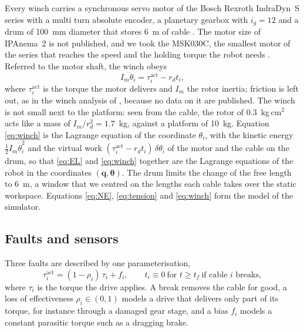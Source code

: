 \documentclass{interact}
\newcommand{\vc}[1]{\bm{#1}}
\begin{document}
Every winch carries a synchronous servo motor of the Bosch Rexroth IndraDyn~S series with a multi turn absolute encoder, a planetary gearbox with $i_g=12$ and a drum of 100~mm diameter that stores 6~m of cable \citep{pott2013ipanema}. The motor size of IPAnema~2 is not published, and we took the MSK030C, the smallest motor of the series that reaches the speed and the holding torque the robot needs \citep{rexroth_msk2018}. Referred to the motor shaft, the winch obeys
\begin{equation}\label{eq:winch}
I_m\ddot\theta_i=\tau_i^{\mathrm{act}}-r_d t_i,
\end{equation}
where $\tau_i^{\mathrm{act}}$ is the torque the motor delivers and $I_m$ the rotor inertia; friction is left out, as in the winch analysis of \citet{ida2022actuators}, because no data on it are published. The winch is not small next to the platform: seen from the cable, the rotor of 0.3~kg\,cm$^2$ acts like a mass of $I_m/r_d^2=1.7$~kg, against a platform of 10~kg. Equation \eqref{eq:winch} is the Lagrange equation of the coordinate $\theta_i$, with the kinetic energy $\tfrac12I_m\dot\theta_i^2$ and the virtual work $(\tau_i^{\mathrm{act}}-r_dt_i)\,\delta\theta_i$ of the motor and the cable on the drum, so that \eqref{eq:EL} and \eqref{eq:winch} together are the Lagrange equations of the robot in the coordinates $(\vc q,\vc\theta)$. The drum limits the change of the free length to 6~m, a window that we centred on the lengths each cable takes over the static workspace. Equations \eqref{eq:NE}, \eqref{eq:tension} and \eqref{eq:winch} form the model of the simulator.

\subsection{Faults and sensors}\label{sec:faults}

Three faults are described by one parameterisation,
\begin{equation}\label{eq:fault}
\tau_i^{\mathrm{act}}=(1-\rho_i)\,\tau_i+f_i,\qquad t_i\equiv0\ \text{for } t\ge t_f\ \text{if cable } i \text{ breaks},
\end{equation}
where $\tau_i$ is the torque the drive applies. A break removes the cable for good, a loss of effectiveness $\rho_i\in(0,1)$ models a drive that delivers only part of its torque, for instance through a damaged gear stage, and a bias $f_i$ models a constant parasitic torque such as a dragging brake.
\end{document}
